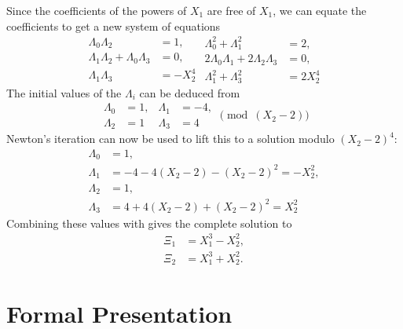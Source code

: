 Since the coefficients of the powers of $X_1$ are free of $X_1$, we
can equate the coefficients to get a new system of equations
\begin{equation}
\begin{aligned}
\Lambda_0 \Lambda_2 & = 1, \\ 
\Lambda_1 \Lambda_2 + \Lambda_0 \Lambda_3 & = 0, \\
\Lambda_1 \Lambda_3 & = - X_2^4
\end{aligned}
\begin{aligned}
\Lambda_0^2 + \Lambda_1^2 & = 2, \\
 2\Lambda_0 \Lambda_1 + 2 \Lambda_2 \Lambda_3 & = 0, \\
   \Lambda_1^2 + \Lambda_3^2 & = 2X_2^4
\end{aligned}
\end{equation}
The initial values of the $\Lambda_i$ can be deduced from
\[
\begin{aligned} \Lambda_0 & = 1, \\ \Lambda_2& = 1 \end{aligned}
\begin{aligned} \Lambda_1 & = -4, \\ \Lambda_3& = 4 \end{aligned}
\pmod{(X_2-2)}
\]
Newton's iteration can now be used to lift this to a solution modulo
$(X_2-2)^4$:
\[
\begin{aligned}
\Lambda_0 & = 1, \\
\Lambda_1 & = -4 -4(X_2-2) -(X_2-2)^2 = -X_2^2, \\
\Lambda_2 & = 1, \\
\Lambda_3 & = 4 + 4(X_2-2) + (X_2-2)^2 = X_2^2
\end{aligned}
\]
Combining these values with  gives the
complete solution to 
\[
\begin{aligned}
\Xi_1 & = X_1^3 - X_2^2, \\
\Xi_2 & = X_1^3 + X_2^2. 
\end{aligned}
\]

\section{Formal Presentation}
\label{SPH:Formal:Sec}

